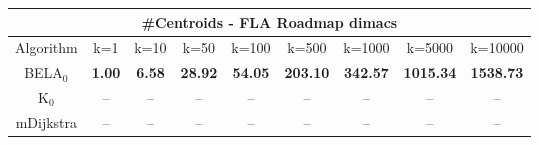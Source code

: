 \begin{tabular}{c|cccccccc}\toprule
\multicolumn{9}{c}{#Centroids - FLA Roadmap dimacs}\\ \midrule
Algorithm & k=1 & k=10 & k=50 & k=100 & k=500 & k=1000 & k=5000 & k=10000 \\ \midrule
BELA$_0$ & \textbf{1.00} & \textbf{6.58} & \textbf{28.92} & \textbf{54.05} & \textbf{203.10} & \textbf{342.57} & \textbf{1015.34} & \textbf{1538.73} \\
K$_0$ & -- & -- & -- & -- & -- & -- & -- & -- \\
mDijkstra & -- & -- & -- & -- & -- & -- & -- & -- \\ \bottomrule 
\end{tabular}
